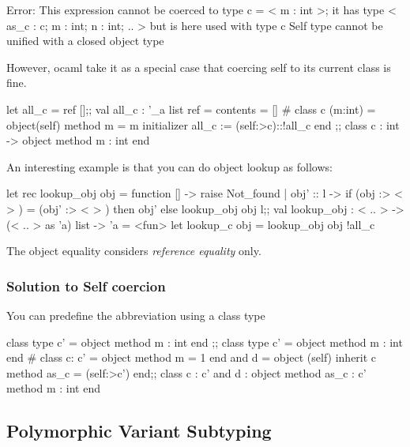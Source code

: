\begin{bashcode}
Error: This expression cannot be coerced to type c = < m : int >; it has type
         < as_c : c; m : int; n : int; .. >
       but is here used with type c
       Self type cannot be unified with a closed object type
     \end{bashcode}

However, ocaml take it as a special case that coercing self to its
current class is fine.     

\begin{ocamlcode}
let all_c = ref [];;
val all_c : '_a list ref = {contents = []}
# class c (m:int) = object(self)
    method m = m
    initializer all_c := (self:>c)::!all_c
end     
;;
        class c : int -> object method m : int end  
\end{ocamlcode}

An interesting example is that you can do object lookup 
as follows:

\begin{ocamlcode}
let rec lookup_obj obj = function [] -> raise Not_found
| obj' :: l -> if (obj :> < > ) = (obj' :> < > ) then obj'
else lookup_obj obj l;;
val lookup_obj : < .. > -> (< .. > as 'a) list -> 'a = <fun>
let lookup_c obj = lookup_obj obj !all_c
\end{ocamlcode}

The object equality considers \textit{reference equality} only.

\subsubsection{Solution to Self coercion}

You can predefine the abbreviation using a class type

\begin{ocamlcode}
class type c' = object method m : int end ;;
class type c' = object method m : int end
# class c: c' = object method m = 1 end
  and d = object (self)
   inherit c
   method as_c = (self:>c')
   end;;
        class c : c'
and d : object method as_c : c' method m : int end  
\end{ocamlcode}

\subsection{Polymorphic Variant Subtyping}

